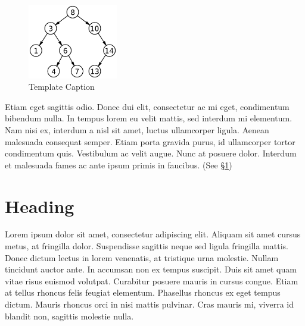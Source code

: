 \documentclass[
  11pt,
  a4paper, twocolumn]{article}
\begin{document}
\begin{figure}
\centering
\includegraphics[width=0.35\textwidth,height=\textheight]{images/Binary_search_tree.png}
\caption{Template Caption}
\end{figure}

Etiam eget sagittis odio. Donec dui elit, consectetur ac mi eget,
condimentum bibendum nulla. In tempus lorem eu velit mattis, sed
interdum mi elementum. Nam nisi ex, interdum a nisl sit amet, luctus
ullamcorper ligula. Aenean malesuada consequat semper. Etiam porta
gravida purus, id ullamcorper tortor condimentum quis. Vestibulum ac
velit augue. Nunc at posuere dolor. Interdum et malesuada fames ac ante
ipsum primis in faucibus. (See \protect\hyperlink{first-heading}{§1})

\hypertarget{heading}{%
\section{Heading}\label{heading}}

Lorem ipsum dolor sit amet, consectetur adipiscing elit. Aliquam sit
amet cursus metus, at fringilla dolor. Suspendisse sagittis neque sed
ligula fringilla mattis. Donec dictum lectus in lorem venenatis, at
tristique urna molestie. Nullam tincidunt auctor ante. In accumsan non
ex tempus suscipit. Duis sit amet quam vitae risus euismod volutpat.
Curabitur posuere mauris in cursus congue. Etiam at tellus rhoncus felis
feugiat elementum. Phasellus rhoncus ex eget tempus dictum. Mauris
rhoncus orci in nisi mattis pulvinar. Cras mauris mi, viverra id blandit
non, sagittis molestie nulla.

  
\end{document}

